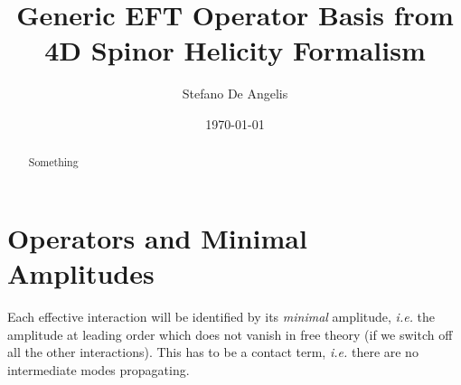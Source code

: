 \documentclass[aps,prd,nofootinbib,twocolumn,10pt]{revtex4-2}
\begin{document}

\title{Generic EFT Operator Basis from 4D Spinor Helicity Formalism}	
\author{Stefano De Angelis}
\date{\today} 
\begin{abstract}
     Something
\end{abstract}
	
	
	
\tableofcontents

\listoftodos


\section{Operators and Minimal Amplitudes}


Each effective interaction will be identified by its {\it minimal} amplitude, {\it i.e.} the amplitude at leading order which does not vanish in free theory (if we switch off all the other interactions). This has to be a contact term, {\it i.e.} there are no intermediate modes propagating.
\end{document}
